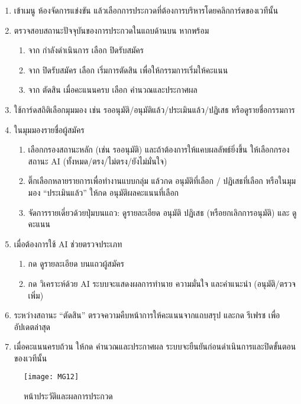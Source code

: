 \begin{sloppypar}
	\begin{enumerate}
		\item เข้าเมนู ห้องจัดการแข่งขัน แล้วเลือกการประกวดที่ต้องการบริหารโดยคลิกการ์ดของเวทีนั้น
		\item ตรวจสอบสถานะปัจจุบันของการประกวดในแถบด้านบน หากพร้อม
		\begin{enumerate}
			\item จาก กำลังดำเนินการ เลือก ปิดรับสมัคร
			\item จาก ปิดรับสมัคร เลือก เริ่มการตัดสิน เพื่อให้กรรมการเริ่มให้คะแนน
			\item จาก ตัดสิน เมื่อคะแนนครบ เลือก คำนวณและประกาศผล
		\end{enumerate}
		\item ใช้การ์ดสถิติเลือกมุมมอง เช่น รออนุมัติ/อนุมัติแล้ว/ประเมินแล้ว/ปฏิเสธ หรือดูรายชื่อกรรมการ
		\item ในมุมมองรายชื่อผู้สมัคร
		\begin{enumerate}
			\item เลือกกรองสถานะหลัก (เช่น รออนุมัติ) และถ้าต้องการให้แคบผลลัพธ์ยิ่งขึ้น ให้เลือกกรองสถานะ AI (ทั้งหมด/ตรง/ไม่ตรง/ยังไม่มั่นใจ)
			\item ติ๊กเลือกหลายรายการเพื่อทำงานแบบกลุ่ม แล้วกด อนุมัติที่เลือก / ปฏิเสธที่เลือก หรือในมุมมอง “ประเมินแล้ว” ให้กด อนุมัติผลคะแนนที่เลือก
			\item จัดการรายเดี่ยวด้วยปุ่มบนแถว: ดูรายละเอียด อนุมัติ ปฏิเสธ (หรือยกเลิกการอนุมัติ) และ ดูคะแนน
		\end{enumerate}
		\item เมื่อต้องการใช้ AI ช่วยตรวจประเภท
		\begin{enumerate}
			\item กด ดูรายละเอียด บนแถวผู้สมัคร
			\item กด วิเคราะห์ด้วย AI ระบบจะแสดงผลการทำนาย ความมั่นใจ และคำแนะนำ (อนุมัติ/ตรวจเพิ่ม)
		\end{enumerate}
		\item ระหว่างสถานะ “ตัดสิน” ตรวจความคืบหน้าการให้คะแนนจากแถบสรุป และกด รีเฟรช เพื่ออัปเดตล่าสุด
		\item เมื่อคะแนนครบถ้วน ให้กด คำนวณและประกาศผล ระบบจะยืนยันก่อนดำเนินการและปิดขั้นตอนของเวทีนั้น
	\end{enumerate}
\end{sloppypar}

\newpage

\begin{figure}[h]
	\centering
	\texttt{[image: MG12]}
	\caption{หน้าประวัติและผลการประกวด}
\end{figure}

